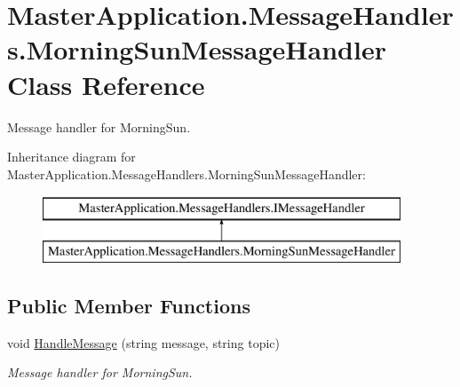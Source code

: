 \hypertarget{class_master_application_1_1_message_handlers_1_1_morning_sun_message_handler}{}\section{Master\+Application.\+Message\+Handlers.\+Morning\+Sun\+Message\+Handler Class Reference}
\label{class_master_application_1_1_message_handlers_1_1_morning_sun_message_handler}


Message handler for Morning\+Sun.  


Inheritance diagram for Master\+Application.\+Message\+Handlers.\+Morning\+Sun\+Message\+Handler\+:\begin{figure}[H]
\begin{center}
\leavevmode
\includegraphics[height=2.000000cm]{class_master_application_1_1_message_handlers_1_1_morning_sun_message_handler}
\end{center}
\end{figure}
\subsection*{Public Member Functions}
\begin{DoxyCompactItemize}
\item 
void \mbox{\hyperlink{class_master_application_1_1_message_handlers_1_1_morning_sun_message_handler_a0e70245da3c7203ab5d1049fe0286c9f}{Handle\+Message}} (string message, string topic)
\begin{DoxyCompactList}\small\item\em Message handler for Morning\+Sun. \end{DoxyCompactList}\end{DoxyCompactItemize}
